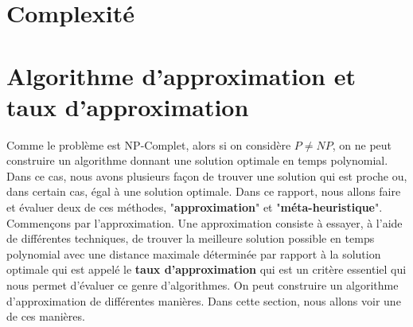 \documentclass[11pt,french]{report}
\begin{document}
	\section{Complexité}
	
	\section{Algorithme d'approximation et taux d'approximation}
	Comme le problème est NP-Complet, alors si on considère $P\neq NP$, on ne peut construire un algorithme donnant une solution optimale en temps polynomial. Dans ce cas, nous avons plusieurs façon de trouver une solution qui est proche ou, dans certain cas, égal à une solution optimale. Dans ce rapport, nous allons faire et évaluer deux de ces méthodes, "\textbf{approximation}" et "\textbf{méta-heuristique}". Commençons par l'approximation. Une approximation consiste à essayer, à l'aide de différentes techniques, de trouver la meilleure solution possible en temps polynomial avec une distance maximale déterminée par rapport à la solution optimale qui est appelé le \textbf{taux d'approximation} qui est un critère essentiel qui nous permet d'évaluer ce genre d'algorithmes. On peut construire un algorithme d'approximation de différentes manières. Dans cette section, nous allons voir une de ces manières.
	
\end{document}
